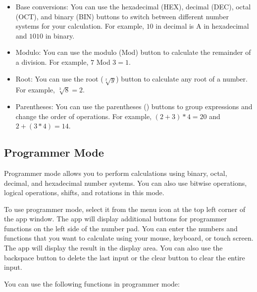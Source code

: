 \documentclass[12pt]{article}
\begin{document}
\begin{itemize}
    \item Base conversions: You can use the hexadecimal (HEX), decimal (DEC), octal (OCT), and binary (BIN) buttons to switch between different number systems for your calculation. For example, $10$ in decimal is A in hexadecimal and $1010$ in binary.
    \item Modulo: You can use the modulo (Mod) button to calculate the remainder of a division. For example, $7$ Mod $3 = 1$.
    \item Root: You can use the root ($\sqrt[x]{y}$) button to calculate any root of a number. For example, $\sqrt[3]{8} = 2$.
    \item Parentheses: You can use the parentheses () buttons to group expressions and change the order of operations. For example, $(2+3)*4 = 20$ and $2+(3*4) = 14$.
\end{itemize}

\pagebreak

\subsection{Programmer Mode}
Programmer mode allows you to perform calculations using binary, octal, decimal, and hexadecimal number systems. You can also use bitwise operations, logical operations, shifts, and rotations in this mode.

To use programmer mode, select it from the menu icon at the top left corner of the app window. The app will display additional buttons for programmer functions on the left side of the number pad. You can enter the numbers and functions that you want to calculate using your mouse, keyboard, or touch screen. The app will display the result in the display area. You can also use the backspace button to delete the last input or the clear button to clear the entire input.

You can use the following functions in programmer mode\cite{calculator-how-to-use}:
\end{document}
